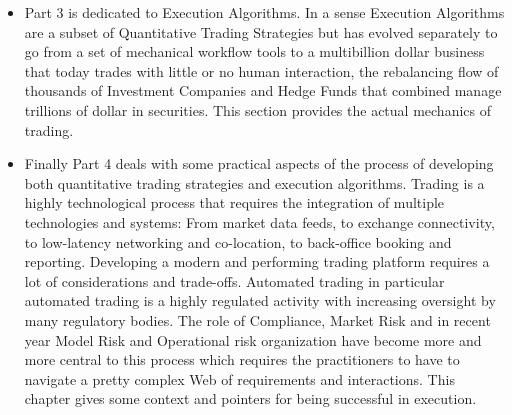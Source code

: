 \begin{itemize}
\item Part 3 is dedicated to Execution Algorithms. In a sense Execution Algorithms are a subset of Quantitative Trading Strategies but has evolved separately to go from a set of mechanical workflow tools to a multibillion dollar business that today trades with little or no human interaction, the rebalancing flow of thousands of Investment Companies and Hedge Funds that combined manage trillions of dollar in securities. This section provides the actual mechanics of trading. 

\item Finally Part 4 deals with some practical aspects of the process of developing both quantitative trading strategies and execution algorithms. Trading is a highly technological process that requires the integration of multiple technologies and systems: From market data feeds, to exchange connectivity, to low-latency networking and co-location, to back-office booking and reporting. Developing a modern and performing trading platform requires a lot of considerations and trade-offs. Automated trading in particular automated trading is a highly regulated activity with increasing oversight by many regulatory bodies. The role of Compliance, Market Risk and in recent year Model Risk and Operational risk organization have become more and more central to this process which requires the practitioners to have to navigate a pretty complex Web of requirements and interactions. This chapter gives some context and pointers for being successful in execution.
\end{itemize}












